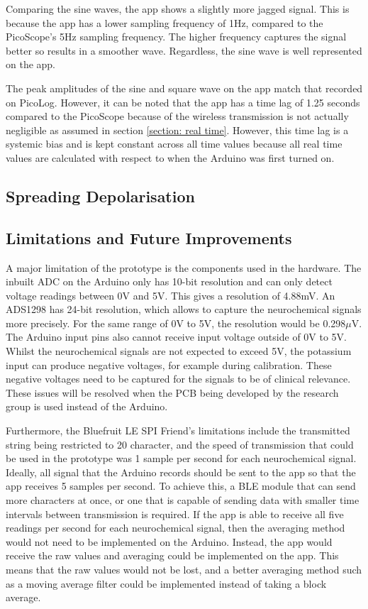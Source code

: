 Comparing the sine waves, the app shows a slightly more jagged signal. This is because the app has a lower sampling frequency of 1Hz, compared to the PicoScope's 5Hz sampling frequency. The higher frequency captures the signal better so results in a smoother wave. Regardless, the sine wave is well represented on the app.

The peak amplitudes of the sine and square wave on the app match that recorded on PicoLog. However, it can be noted that the app has a time lag of 1.25 seconds compared to the PicoScope because of the wireless transmission is not actually negligible as assumed in section \ref{section: real time}. However, this time lag is a systemic bias and is kept constant across all time values because all real time values are calculated with respect to when the Arduino was first turned on.



\subsection{Spreading Depolarisation}




\subsection{Limitations and Future Improvements}
A major limitation of the prototype is the components used in the hardware. The inbuilt ADC on the Arduino only has 10-bit resolution and can only detect voltage readings between 0V and 5V. This gives a resolution of 4.88mV. An ADS1298 has 24-bit resolution, which allows to capture the neurochemical signals more precisely. For the same range of 0V to 5V, the resolution would be 0.298$\mu$V. The Arduino input pins also cannot receive input voltage outside of 0V to 5V. Whilst the neurochemical signals are not expected to exceed 5V, the potassium input can produce negative voltages, for example during calibration. These negative voltages need to be captured for the signals to be of clinical relevance. These issues will be resolved when the PCB being developed by the research group is used instead of the Arduino.

Furthermore, the Bluefruit LE SPI Friend's limitations include the transmitted string being restricted to 20 character, and the speed of transmission that could be used in the prototype was 1 sample per second for each neurochemical signal. Ideally, all signal that the Arduino records should be sent to the app so that the app receives 5 samples per second. To achieve this, a BLE module that can send more characters at once, or one that is capable of sending data with smaller time intervals between transmission is required. If the app is able to receive all five readings per second for each neurochemical signal, then the averaging method would not need to be implemented on the Arduino. Instead, the app would receive the raw values and averaging could be implemented on the app. This means that the raw values would not be lost, and a better averaging method such as a moving average filter could be implemented instead of taking a block average.

